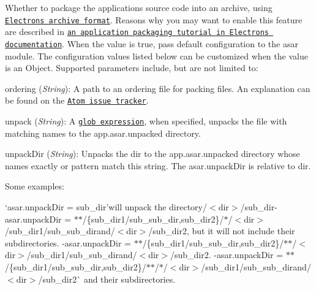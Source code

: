 Whether to package the application\textquotesingle{}s source code into an archive, using \href{https://github.com/electron/asar}{\tt Electron\textquotesingle{}s archive format}. Reasons why you may want to enable this feature are described in \href{http://electron.atom.io/docs/v0.36.0/tutorial/application-packaging/}{\tt an application packaging tutorial in Electron\textquotesingle{}s documentation}. When the value is {\ttfamily true}, pass default configuration to the {\ttfamily asar} module. The configuration values listed below can be customized when the value is an {\ttfamily Object}. Supported parameters include, but are not limited to\+:
\begin{DoxyItemize}
\item {\ttfamily ordering} ({\itshape String})\+: A path to an ordering file for packing files. An explanation can be found on the \href{https://github.com/atom/atom/issues/10163}{\tt Atom issue tracker}.
\item {\ttfamily unpack} ({\itshape String})\+: A \href{https://github.com/isaacs/minimatch#features}{\tt glob expression}, when specified, unpacks the file with matching names to the {\ttfamily app.\+asar.\+unpacked} directory.
\item {\ttfamily unpack\+Dir} ({\itshape String})\+: Unpacks the dir to the {\ttfamily app.\+asar.\+unpacked} directory whose names exactly or pattern match this string. The {\ttfamily asar.\+unpack\+Dir} is relative to {\ttfamily dir}.

Some examples\+:
\begin{DoxyItemize}
\item `asar.\+unpack\+Dir = \textquotesingle{}sub\+\_\+dir'{\ttfamily will unpack the directory}/$<$dir$>$/sub\+\_\+dir{\ttfamily  -\/}asar.\+unpack\+Dir = \textquotesingle{}$\ast$$\ast$/\{sub\+\_\+dir1/sub\+\_\+sub\+\_\+dir,sub\+\_\+dir2\}/$\ast$/$<$dir$>$/sub\+\_\+dir1/sub\+\_\+sub\+\_\+dir{\ttfamily and}/$<$dir$>$/sub\+\_\+dir2{\ttfamily , but it will not include their subdirectories. -\/}asar.\+unpack\+Dir = \textquotesingle{}$\ast$$\ast$/\{sub\+\_\+dir1/sub\+\_\+sub\+\_\+dir,sub\+\_\+dir2\}/$\ast$$\ast$/$<$dir$>$/sub\+\_\+dir1/sub\+\_\+sub\+\_\+dir{\ttfamily and}/$<$dir$>$/sub\+\_\+dir2{\ttfamily . -\/}asar.\+unpack\+Dir = \textquotesingle{}$\ast$$\ast$/\{sub\+\_\+dir1/sub\+\_\+sub\+\_\+dir,sub\+\_\+dir2\}/$\ast$$\ast$/$\ast$/$<$dir$>$/sub\+\_\+dir1/sub\+\_\+sub\+\_\+dir{\ttfamily and}/$<$dir$>$/sub\+\_\+dir2\`{} and their subdirectories.
\end{DoxyItemize}
\end{DoxyItemize}

